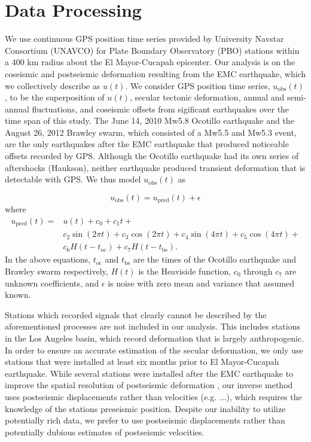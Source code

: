 \documentclass[12pt]{article}
\begin{document}
\section*{Data Processing}

We use continuous GPS position time series provided by University Navstar Consortium (UNAVCO) for Plate Boundary Observatory (PBO) stations within a 400 km radius about the El Mayor-Cucapah epicenter. Our analysis is on the coseismic and postseismic deformation resulting from the EMC earthquake, which we collectively describe as $u(t)$. We consider GPS position time series, $u_\mathrm{obs}(t)$, to be the superposition of $u(t)$, secular tectonic deformation, annual and semi-annual fluctuations, and coseismic offsets from sigificant earthquakes over the time span of this study.  The June 14, 2010 Mw5.8 Ocotillo earthquake and the August 26, 2012 Brawley swarm, which consisted of a Mw5.5 and Mw5.3 event, are the only earthquakes after the EMC earthquake that produced noticeable offsets recorded by GPS. Although the Ocotillo earthquake had its own series of aftershocks (Haukson), neither earthquake produced transient deformation that is detectable with GPS. We thus model $u_\mathrm{obs}(t)$ as 

\begin{equation}
  u_\mathrm{obs}(t) = u_\mathrm{pred}(t) + \epsilon
\end{equation}
where
\begin{equation}\label{TimeSeriesModel}
  \begin{split}  
    u_\mathrm{pred}(t) = &u(t) + c_0 + c_1t + \\
                         &c_2\sin(2\pi t) + c_3\cos(2\pi t) + c_4\sin(4\pi t) + c_5\cos(4\pi t) + \\
                         &c_6H(t-t_\mathrm{oc}) + c_7H(t-t_\mathrm{bs}).
  \end{split}
\end{equation}
In the above equations, $t_\mathrm{oc}$ and $t_\mathrm{bs}$ are the times of the Ocotillo earthquake and Brawley swarm respectively, $H(t)$ is the Heaviside function, $c_0$ through $c_7$ are unknown coefficients, and $\epsilon$ is noise with zero mean and variance that assumed known.

Stations which recorded signals that clearly cannot be described by the aforementioned processes are not included in our analysis. This includes stations in the Los Angeles basin, which record deformation that is largely anthropogenic. In order to ensure an accurate estimation of the secular deformation, we only use stations that were installed at least six months prior to El Mayor-Cucapah earthquake. While several stations were installed after the EMC earthquake to improve the spatial resolution of postseismic deformation \cite{Spinler2015}, our inverse method uses postseismic displacements rather than velocities (e.g. ...), which requires the knowledge of the stations preseismic position. Despite our inability to utilize potentially rich data, we prefer to use postseismic displacements rather than potentially dubious estimates of postseismic velocities.
\end{document}
